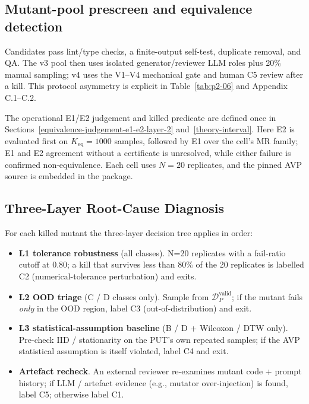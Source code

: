 \documentclass[manuscript,screen,review]{acmart}
\begin{document}
\subsection{Mutant-pool prescreen and equivalence detection}\label{mutant-pool-prescreen-and-equivalence-detection}

Candidates pass lint/type checks, a finite-output self-test, duplicate
removal, and QA. The v3 pool then uses isolated generator/reviewer LLM
roles plus 20\% manual sampling; v4 uses the V1--V4 mechanical gate and
human C5 review after a kill. This protocol asymmetry is explicit in
Table~\ref{tab:p2-06} and Appendix C.1--C.2.

The operational E1/E2 judgement and killed predicate are defined once in
Sections~\ref{equivalence-judgement-e1-e2-layer-2}
and~\ref{theory-interval}. Here E2 is evaluated first on
\(K_{\mathrm{eq}}=1000\) samples, followed by E1 over the cell's MR
family; E1 and E2 agreement without a certificate is unresolved, while
either failure is confirmed non-equivalence. Each cell uses \(N=20\)
replicates, and the pinned AVP source is embedded in the package.

\subsection{Three-Layer Root-Cause Diagnosis}\label{lrca-three-layer-diagnosis}

For each killed mutant the three-layer decision tree applies in order:

\begin{itemize}

\item
  \textbf{L1 tolerance robustness} (all classes). N=20 replicates with a
  fail-ratio cutoff at 0.80; a kill that survives less than 80\% of the
  20 replicates is labelled C2 (numerical-tolerance perturbation) and
  exits.
\item
  \textbf{L2 OOD triage} (C / D classes only). Sample from
  $\mathcal{D}_P^{\mathrm{valid}}$; if the mutant fails \emph{only} in the OOD
  region, label C3 (out-of-distribution) and exit.
\item
  \textbf{L3 statistical-assumption baseline} (B / D + Wilcoxon / DTW
  only). Pre-check IID / stationarity on the PUT's own repeated samples;
  if the AVP statistical assumption is itself violated, label C4 and
  exit.
\item
  \textbf{Artefact recheck}. An external reviewer re-examines mutant
  code + prompt history; if LLM / artefact evidence (e.g., mutator
  over-injection) is found, label C5; otherwise label C1.
\end{itemize}
\end{document}
